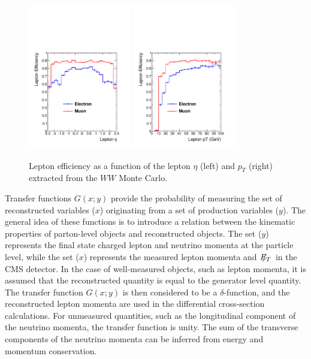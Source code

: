 \documentclass{cmspaper}
\newcommand{\met}{\mbox{$E_T\hspace{-1.1em}/$\hspace{0.7em}}}
\begin{document}
\begin{figure}[!htbp]
\begin{center}
\includegraphics[width=0.4\textwidth]{figures/lepton_eff_Eta.pdf}
\includegraphics[width=0.4\textwidth]{figures/lepton_eff_Pt.pdf}\\
\caption{Lepton efficiency as a function of the lepton $\eta$ (left) and $p_{T}$ (right) extracted 
from the $WW$ Monte Carlo.}
\label{fig:lepeff_gen}
\end{center}
\end{figure}

Transfer functions $G(x;y)$ provide the probability of measuring the set of reconstructed variables ($x$) originating 
from a set of production variables ($y$). 
The general idea of these functions is to introduce a relation between the kinematic properties of parton-level objects
and reconstructed objects.
The set ($y$) represents the final state charged lepton and neutrino momenta at
the particle level, while the set ($x$) represents the measured lepton momenta and $\met$ in the CMS
detector. 
In the case of well-measured objects, such as lepton momenta, it is assumed that the reconstructed quantity is equal
to the generator level quantity.  The transfer function $G(x;y)$ is then considered to be a $\delta$-function, and the 
reconstructed lepton momenta are used in the differential cross-section calculations. For unmeasured quantities, such as
the longitudinal component of the neutrino momenta, the transfer function is unity. The sum of the transverse components
of the neutrino momenta can be inferred from energy and momentum conservation.
\end{document}
